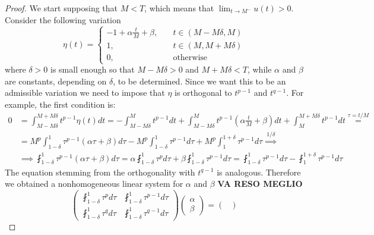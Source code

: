 \documentclass[corpo=11pt, stile=classica, tipotesi=custom,
greek, evenboxes, english]{toptesi}
\numberwithin{equation}{chapter}
\theoremstyle{remark}
\begin{document}
\begin{proof}
We start supposing that $M < T$, which means that $\lim_{t \rightarrow M^-} u(t) > 0$. Consider the following variation 
\begin{equation*}
	\eta(t) = \left\{
	\begin{aligned}
		-1 + \alpha \frac{t}{M} + \beta,\quad & t \in (M-M\delta,M)\\
		1,\quad					   & t \in (M,M+M\delta)\\
		0,\quad				   & \text{otherwise}
	\end{aligned}\right.
\end{equation*}
where $\delta>0$ is small enough so that $M-M\delta >0$ and $M+M\delta < T$, while $\alpha$ and $\beta$ are constants, depending on $\delta$, to be determined. Since we want this to be an admissible variation we need to impose that $\eta$ is orthogonal to $t^{p-1}$ and $t^{q-1}$. For example, the first condition is:
\begin{align*}
	0 &= \int_{M-M\delta}^{M+M\delta} t^{p-1} \eta(t) dt = -\int_{M-M\delta}^M t^{p-1}dt + \int_{M-M\delta}^M t^{p-1}\left(\alpha \frac{t}{M} + \beta\right) dt + \int_M^{M+M\delta} t^{p-1}dt \overset{\tau=t/M}{=}\\
	  &= M^p \int_{1-\delta}^1 \tau^{p-1}(\alpha \tau + \beta) d\tau - M^p \int_{1-\delta}^1 \tau^{p-1} d\tau + M^p \int_1^{1+\delta} \tau^{p-1} d\tau \overset{1/\delta}{\implies}\\
	  &\implies \fint_{1-\delta}^1 \tau^{p-1}(\alpha \tau + \beta) d\tau = \alpha \fint_{1-\delta}^1 \tau^{p} d\tau + \beta \fint_{1-\delta}^1 \tau^{p-1} d\tau = \fint_{1-\delta}^1 \tau^{p-1} d\tau - \fint_1^{1+\delta} \tau^{p-1} d\tau 
\end{align*}
The equation stemming from the orthogonality with $t^{q-1}$ is analogous. Therefore we obtained a nonhomogeneous linear system for $\alpha$ and $\beta$
\textbf{VA RESO MEGLIO}
\begin{equation}\label{system continuity}
	\begin{pmatrix}
		 \fint_{1-\delta}^1 \tau^{p} d\tau &   \fint_{1-\delta}^1 \tau^{p-1} d\tau\\
		 \fint_{1-\delta}^1 \tau^{q} d\tau &   \fint_{1-\delta}^1 \tau^{q-1} d\tau
	\end{pmatrix}
	\begin{pmatrix}
		\alpha\\
		\beta
	\end{pmatrix}=
	\begin{pmatrix}

\end{pmatrix}
\end{equation}
\end{proof}
\end{document}
